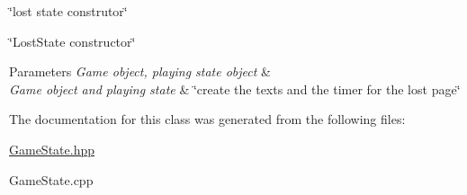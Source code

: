 \char`\"{}lost state construtor\char`\"{} 

\char`\"{}\+Lost\+State constructor\char`\"{}


\begin{DoxyParams}{Parameters}
{\em Game object, playing state object} & \\
\hline
{\em Game object and playing state} & \char`\"{}create the texts and the timer for the lost page\char`\"{} \\
\hline
\end{DoxyParams}


The documentation for this class was generated from the following files\+:\begin{DoxyCompactItemize}
\item 
\hyperlink{GameState_8hpp}{Game\+State.\+hpp}\item 
Game\+State.\+cpp\end{DoxyCompactItemize}
